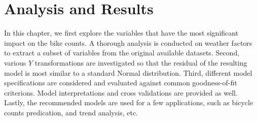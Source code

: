 \documentclass [11pt, proquest] {uwthesis}[2015/03/03]
\begin{document}
%
%
%
%
%

 
\chapter{Analysis and Results}

In this chapter, we first explore the variables that have the most significant impact on the bike counts. A thorough analysis is conducted on weather factors to extract a subset of variables from the original available datasets. Second, various $Y$ transformations are investigated so that the residual of the resulting model is most similar to a standard Normal distribution. Third, different model specifications are considered and evaluated against common goodness-of-fit criterions. Model interpretations and cross validations are provided as well. Lastly, the recommended models are used for a few applications, such as bicycle counts predication, and trend analysis, etc.
\end{document}
